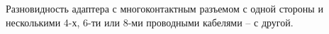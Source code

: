 Разновидность адаптера с многоконтактным разъемом с
одной стороны и несколькими 4-х, 6-ти или 8-ми проводными
кабелями -- с другой.